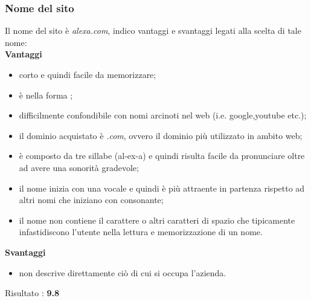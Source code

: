 \subsubsection{Nome del sito}
Il nome del sito è \textit{alexa.com}, indico vantaggi e svantaggi legati alla scelta di tale nome: \\
\textbf{Vantaggi}
\begin{itemize}
	\item corto e quindi facile da memorizzare;
	\item è nella forma ;
	\item difficilmente confondibile con nomi arcinoti nel web (i.e. google,youtube etc.);
	\item il dominio acquistato è \textit{.com}, ovvero il dominio più utilizzato in ambito web;
	\item è composto da tre sillabe (al-ex-a) e quindi risulta facile da pronunciare
	oltre ad avere una sonorità gradevole;
	\item il nome inizia con una vocale e quindi è più attraente in partenza rispetto
	ad altri nomi che iniziano con consonante;
	\item il nome non contiene il carattere \quotes{-} o altri caratteri di spazio 
	che tipicamente infastidiscono l'utente nella lettura e memorizzazione di un nome.
\end{itemize}
\textbf{Svantaggi}
\begin{itemize}
	\item non descrive direttamente ciò di cui si occupa l'azienda.
\end{itemize}
Risultato : \textbf{9.8}
